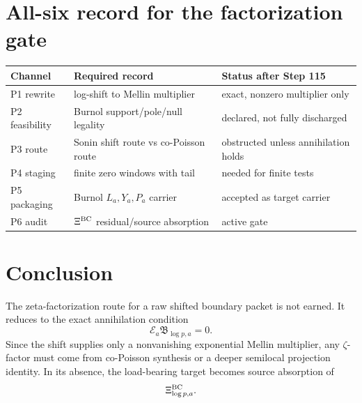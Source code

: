 \documentclass[11pt]{article}
\newcommand{\E}{\mathcal E}
\begin{document}
\section{All-six record for the factorization gate}
\begin{center}
\begin{tabular}{lll}
\toprule
Channel & Required record & Status after Step 115\\
\midrule
P1 rewrite & log-shift to Mellin multiplier & exact, nonzero multiplier only\\
P2 feasibility & Burnol support/pole/null legality & declared, not fully discharged\\
P3 route & Sonin shift route vs co-Poisson route & obstructed unless annihilation holds\\
P4 staging & finite zero windows with tail & needed for finite tests\\
P5 packaging & Burnol \(L_a,Y_a,P_a\) carrier & accepted as target carrier\\
P6 audit & \(\Xi^{\rm BC}\) residual/source absorption & active gate\\
\bottomrule
\end{tabular}
\end{center}

\section{Conclusion}
The zeta-factorization route for a raw shifted boundary packet is not earned.  It reduces to the exact annihilation condition
\[
  \E_a\mathfrak B_{\log p,a}=0.
\]
Since the shift supplies only a nonvanishing exponential Mellin multiplier, any \(\zeta\)-factor must come from co-Poisson synthesis or a deeper semilocal projection identity.  In its absence, the load-bearing target becomes source absorption of
\[
  \Xi^{\rm BC}_{\log p,a}.
\]
\end{document}

